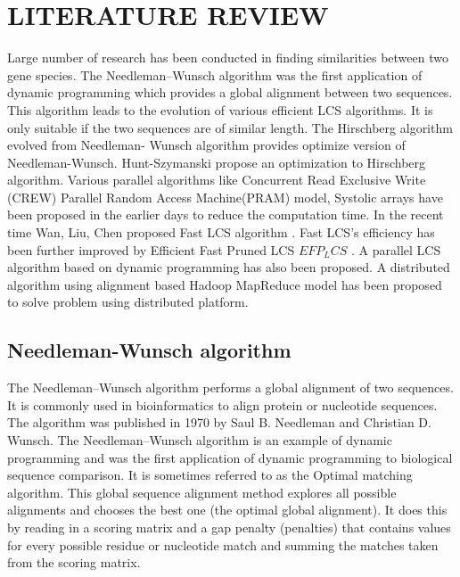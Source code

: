 \documentclass[journal,twoside]{IEEEtran}
\begin{document}
\section{LITERATURE REVIEW}
Large number of research has been conducted in finding similarities between two gene species. The Needleman–Wunsch \cite{needleman} algorithm was the first application of dynamic programming which provides a global alignment between two sequences. This algorithm leads to the evolution of various efficient LCS algorithms. It is only suitable if the two sequences are of similar length. The Hirschberg \cite{hirschberg} algorithm evolved from Needleman- Wunsch algorithm provides optimize version of Needleman-Wunsch. Hunt-Szymanski \cite{hunt} propose an optimization to Hirschberg algorithm.
Various parallel algorithms like Concurrent Read Exclusive Write (CREW) Parallel Random Access Machine(PRAM) model, Systolic arrays have been proposed in the earlier days to reduce the computation time. In the recent time Wan, Liu, Chen proposed Fast LCS algorithm \cite{chen}. Fast LCS’s efficiency has been further improved by Efficient Fast Pruned LCS \(EFP_LCS\) \cite{eswaran}. A parallel LCS algorithm \cite{dhraief} based on dynamic programming has also been proposed. A distributed algorithm using alignment based Hadoop MapReduce model \cite{bohora} has been proposed to solve problem using distributed platform. 
\subsection{Needleman-Wunsch algorithm}
The Needleman–Wunsch algorithm performs a global alignment of two sequences. It is commonly used in bioinformatics to align protein or nucleotide sequences. The algorithm was published in 1970 by Saul B. Needleman and Christian D. Wunsch. The Needleman–Wunsch algorithm is an example of dynamic programming and was the first application of dynamic programming to biological sequence comparison. It is sometimes referred to as the Optimal matching algorithm. This global sequence alignment method explores all possible alignments and chooses  the best one (the optimal global alignment). It does this by reading in a scoring matrix and a gap penalty (penalties) that contains values for every possible residue or nucleotide match and summing the matches taken from the scoring matrix.
\end{document}
